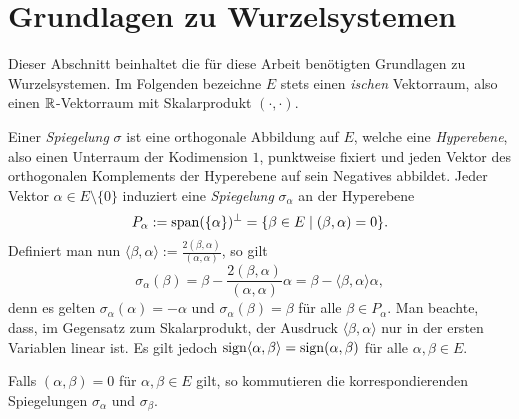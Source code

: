 \section{Grundlagen zu Wurzelsystemen}
\label{sec:grundlagen}

Dieser Abschnitt beinhaltet die für diese Arbeit benötigten Grundlagen zu Wurzelsystemen.  
Im Folgenden bezeichne $E$ stets einen \emph{\euklid ischen} Vektorraum, also einen $\mathbb{R}$\hyp{}Vektorraum mit Skalarprodukt $(\cdot,\cdot)$.

Einer \emph{Spiegelung} $\sigma$ ist eine orthogonale Abbildung auf $E$, welche eine \emph{Hyperebene}, also einen Unterraum der Kodimension $1$, punktweise fixiert und jeden Vektor des orthogonalen Komplements der Hyperebene auf sein Negatives abbildet.
Jeder Vektor $\alpha \in E \setminus \{0\}$ induziert eine \emph{Spiegelung} $\sigma_\alpha$ an der Hyperebene 
\begin{displaymath}
  P_\alpha := \operatorname{span}(\{\alpha\})^\perp = \{\beta \in E \mid (\beta, \alpha) = 0\}.
\end{displaymath}
Definiert man nun $\langle \beta, \alpha \rangle := \tfrac{2 (\beta, \alpha)}{(\alpha, \alpha)}$, so gilt
\begin{displaymath}
  \label{eq:RF}
  \sigma_\alpha(\beta) 
  = \beta - \frac{2 (\beta, \alpha)}{(\alpha,\alpha)} \alpha 
  = \beta - \langle \beta, \alpha \rangle \alpha,\tag{RF}
\end{displaymath}
denn es gelten $\sigma_\alpha(\alpha) = -\alpha$ und $\sigma_\alpha(\beta) = \beta$ für alle $\beta \in P_\alpha$.
Man beachte, dass, im Gegensatz zum Skalarprodukt, der Ausdruck $\langle \beta, \alpha \rangle$ nur in der ersten Variablen linear ist.
Es gilt jedoch $\operatorname{sign} \langle \alpha, \beta \rangle = \operatorname{sign} (\alpha, \beta)$ für alle $\alpha, \beta \in E$.

\begin{lem}
  \label{lem:orthogonalRoots}
  Falls $(\alpha, \beta) = 0$ für $\alpha, \beta \in E$ gilt, so kommutieren die korrespondierenden Spiegelungen $\sigma_\alpha$ und $\sigma_\beta$.
\end{lem}


